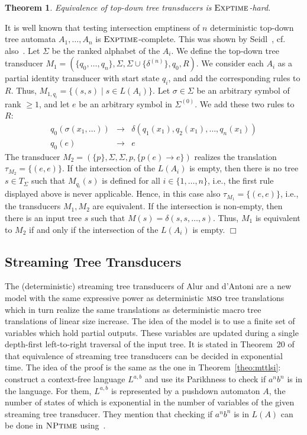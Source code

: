\documentclass[copyright,creativecommons]{eptcs}
\newtheorem{theorem}{Theorem}
\newcommand{\eop}{\hspace*{\fill}$\Box$}
\newenvironment{proof}{{\it Proof.}\quad}{\eop\vspace*{4mm}}
\newcommand{\mso}{\textsc{mso}}
\newcommand{\dexptime}{\textsc{Exptime}}
\newcommand{\nptime}{\textsc{NPtime}}
\begin{document}
\begin{theorem}\label{theo:hard}
Equivalence of top-down tree transducers is $\dexptime$-hard.
\end{theorem}
\begin{proof}
It is well known that testing intersection emptiness of $n$ deterministic
top-down tree automata $A_1,\dots,A_n$ is $\dexptime$-complete. This was shown 
by Seidl~\cite{DBLP:journals/ipl/Seidl94}, cf. also~\cite{tata07}.
Let $\Sigma$ be the ranked alphabet of the $A_i$. 
We define the top-down tree transducer $M_1=(\{q_0,\dots, q_n\},\Sigma,\Sigma\cup\{\delta^{(n)}\},q_0,R)$.
We consider each $A_i$ as a partial identity transducer with start state $q_i$,
and add the corresponding rules to $R$. Thus, $M_{1,q_i}=\{(s,s)\mid s\in L(A_i)\}$.
Let $\sigma\in\Sigma$ be an arbitrary symbol of rank $\geq 1$,
and let $e$ be an arbitrary symbol in $\Sigma^{(0)}$.
We add these two rules to $R$:
\[
\begin{array}{lcl}
q_0(\sigma(x_1,\dots))&\to&\delta(q_1(x_1), q_2(x_1), \dots, q_n(x_1))\\
q_0(e)&\to&e
\end{array}
\]
The transducer $M_2=(\{p\},\Sigma,\Sigma,p,\{p(e)\to e\})$ realizes the
translation $\tau_{M_2} = \{(e,e)\}$.
If the intersection of the $L(A_i)$ is empty, then there is no tree $s\in T_\Sigma$ such
that $M_{q_i}(s)$ is defined for all $i\in\{1,\dots, n\}$, i.e., 
the first rule displayed above is never applicable. 
Hence, in this case also $\tau_{M_1}=\{(e,e)\}$, i.e., the transducers $M_1,M_2$
are equivalent. If the intersection is non-empty, then there is an input tree $s$ such that
$M(s)=\delta(s,s,\dots, s)$. 
Thus, $M_1$ is equivalent to $M_2$ if and only if the intersection of the $L(A_i)$ is empty.
\end{proof}


\subsection{Streaming Tree Transducers}

The (deterministic) streaming tree transducers of Alur and d'Antoni are a new model
with the same expressive power as deterministic $\mso$ tree translations which in turn
realize the same translations as deterministic macro tree translations of linear 
size increase. The idea of the model is to use a finite set of variables which hold
partial outputs. These variables are updated during a single depth-first left-to-right 
traversal of the input tree. It is stated in Theorem~20 of~\cite{DBLP:journals/corr/abs-1104-2599}
that equivalence of streaming tree transducers can be decided in exponential time.
The idea of the proof is the same as the one in Theorem~\ref{theo:mttlsi}:
construct a context-free language $L^{a,b}$ and use its Parikhness to
check if $a^nb^n$ is in the language. For them, $L^{a,b}$ is represented by a 
pushdown automaton $A$, the number of states of which is exponential in the number
of variables of the given streaming tree transducer.
They mention that checking if $a^nb^n$ is in $L(A)$
can be done in $\nptime$ using~\cite{DBLP:journals/fuin/Esparza97,DBLP:conf/icalp/SeidlSMH04}.
\end{document}
